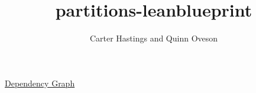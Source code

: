 \documentclass{report}
\title{partitions-leanblueprint}
\author{Carter Hastings and Quinn Oveson}
\begin{document}
\maketitle
\begin{center}
\href{https://dozenalist.github.io/Partitions-mod-p/dep_graph_document.html}{Dependency Graph}
\end{center}


\end{document}
